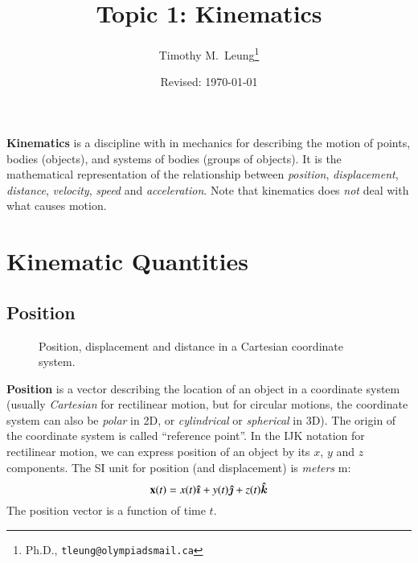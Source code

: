 \documentclass[11pt]{article}
\title{Topic 1: Kinematics}
\author{Timothy M.\ Leung\thanks{Ph.D., \texttt{tleung@olympiadsmail.ca}}}
\affil{Olympiads School\\Toronto, Ontario, Canada}
\date{Revised: \today}
\newcommand{\mb}[1]{\ensuremath\mathbf{#1}}
\begin{document}
\maketitle

\textbf{Kinematics} is a discipline with in mechanics for describing the
motion of points, bodies (objects), and systems of  bodies (groups of objects).
It is the mathematical representation of the relationship between
\emph{position}, \emph{displacement}, \emph{distance}, \emph{velocity},
\emph{speed} and \emph{acceleration}. Note that kinematics does \emph{not}
deal with what causes motion.

\section{Kinematic Quantities}

\subsection{Position}

\begin{wrapfigure}{r}{.35\textwidth}
  \centering
  \vspace{-.1in}
  \caption{Position, displacement and distance in a Cartesian coordinate
    system.}
  \label{fig:d-vs-d}
\end{wrapfigure}
\textbf{Position} is a vector describing the location of an object in a
coordinate system (usually \emph{Cartesian} for rectilinear motion, but for
circular motions, the coordinate system can also be \emph{polar} in 2D, or
\emph{cylindrical} or \emph{spherical} in 3D). The origin of the coordinate
system is called ``reference point''.  In the IJK notation for rectilinear
motion, we can express position of an object by its $x$, $y$ and $z$
components. The SI unit for position (and displacement) is \emph{meters}
\si{\meter}:
\begin{equation*}
  \mb{x}(t)=x(t)\bm{\hat{\imath}} + y(t)\bm{\hat{\jmath}} + z(t)\bm{\hat{k}}
\end{equation*}
The position vector is a function of time $t$.
\end{document}

